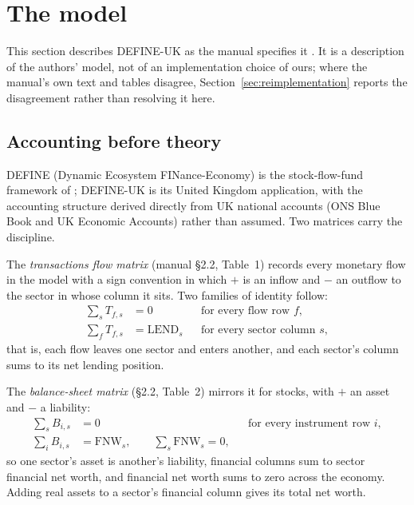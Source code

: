 \section{The model}
\label{sec:model}

This section describes DEFINE-UK as the manual specifies it \citep{georgedafermos2026manual}. It is a description of the authors' model, not of an implementation choice of ours; where the manual's own text and tables disagree, Section~\ref{sec:reimplementation} reports the disagreement rather than resolving it here.

\subsection{Accounting before theory}
\label{sec:accounting}

DEFINE (Dynamic Ecosystem FINance-Economy) is the stock-flow-fund framework of \citet{dafermos2017}; DEFINE-UK is its United Kingdom application, with the accounting structure derived directly from UK national accounts (ONS Blue Book and UK Economic Accounts) rather than assumed. Two matrices carry the discipline.

The \emph{transactions flow matrix} (manual \S2.2, Table~1) records every monetary flow in the model with a sign convention in which $+$ is an inflow and $-$ an outflow to the sector in whose column it sits. Two families of identity follow:
\begin{align}
\sum_{s} T_{f,s} &= 0 && \text{for every flow row } f, \label{eq:trow}\\
\sum_{f} T_{f,s} &= \mathrm{LEND}_s && \text{for every sector column } s, \label{eq:tcol}
\end{align}
that is, each flow leaves one sector and enters another, and each sector's column sums to its net lending position.

The \emph{balance-sheet matrix} (\S2.2, Table~2) mirrors it for stocks, with $+$ an asset and $-$ a liability:
\begin{align}
\sum_{s} B_{i,s} &= 0 && \text{for every instrument row } i, \label{eq:brow}\\
\sum_{i} B_{i,s} &= \mathrm{FNW}_s, \qquad \sum_{s} \mathrm{FNW}_s = 0, \label{eq:bcol}
\end{align}
so one sector's asset is another's liability, financial columns sum to sector financial net worth, and financial net worth sums to zero across the economy. Adding real assets to a sector's financial column gives its total net worth.

